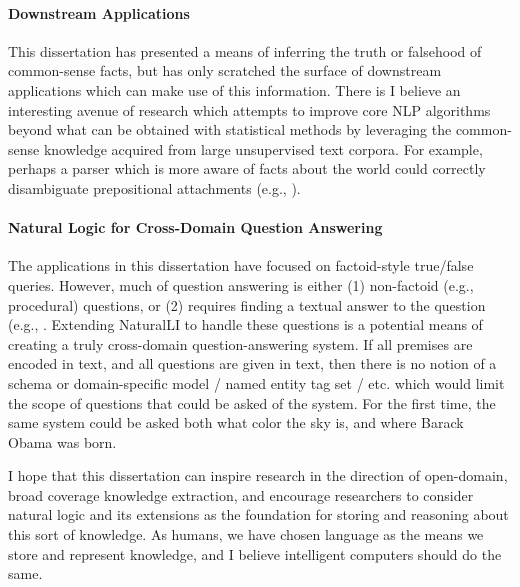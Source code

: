 \paragraph{Downstream Applications} This dissertation has presented a means of inferring the truth or
  falsehood of common-sense facts, but has only scratched the surface of downstream applications which
  can make use of this information.
There is I believe an interesting avenue of research which attempts to improve core NLP algorithms
  beyond what can be obtained with statistical methods by leveraging the common-sense knowledge acquired
  from large unsupervised text corpora.
For example, perhaps a parser which is more aware of facts about the world could correctly disambiguate
  prepositional attachments (e.g., ).

\paragraph{Natural Logic for Cross-Domain Question Answering}
The applications in this dissertation have focused on factoid-style true/false queries.
However, much of question answering is either (1) non-factoid (e.g., procedural) questions, or
  (2) requires finding a textual answer to the question (e.g., .
Extending NaturalLI to handle these questions is a potential means of creating a truly cross-domain
  question-answering system.
If all premises are encoded in text, and all questions are given in text, then there is no notion of
  a schema or domain-specific model / named entity tag set / etc. which would limit the scope of questions
  that could be asked of the system.
For the first time, the same system could be asked both what color the sky is, and where Barack Obama was
  born.

I hope that this dissertation can inspire research in the direction of open-domain, broad coverage
  knowledge extraction, and encourage researchers to consider natural logic and its extensions
  as the foundation for storing and reasoning about this sort of knowledge.
As humans, we have chosen language as the means we store and represent knowledge, and I believe
  intelligent computers should do the same.


